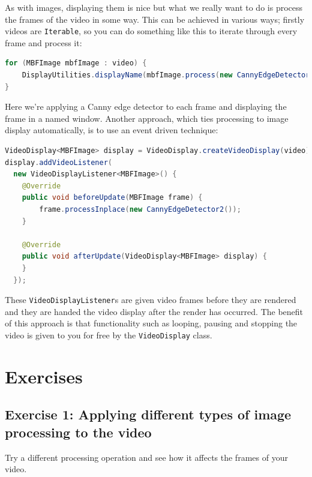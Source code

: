 As with images, displaying them is nice but what we really want to do is process the frames of 
the video in some way. This can be achieved in various ways; firstly videos are \verb+Iterable+, so you can 
do something like this to iterate through every frame and process it:
\begin{lstlisting}[language=java]
for (MBFImage mbfImage : video) {
    DisplayUtilities.displayName(mbfImage.process(new CannyEdgeDetector2()), "videoFrames");
}
\end{lstlisting}
Here we're applying a Canny edge detector to each frame and displaying the frame in a named window. Another 
approach, which ties processing to image display automatically, is to use an event driven technique:
\begin{lstlisting}[language=java]
VideoDisplay<MBFImage> display = VideoDisplay.createVideoDisplay(video);
display.addVideoListener(
  new VideoDisplayListener<MBFImage>() {
    @Override
    public void beforeUpdate(MBFImage frame) {
        frame.processInplace(new CannyEdgeDetector2());
    }

    @Override
    public void afterUpdate(VideoDisplay<MBFImage> display) {
    }
  });
\end{lstlisting}

These \verb+VideoDisplayListener+s are given video frames before they are rendered and they are handed the 
video display after the render has occurred. The benefit of this approach is that functionality such as 
looping, pausing and stopping the video is given to you for free by the \verb+VideoDisplay+ class. 

\section*{Exercises}
\subsection*{Exercise 1: Applying different types of image processing to the video}
Try a different processing operation and see how it affects the frames of your video.
